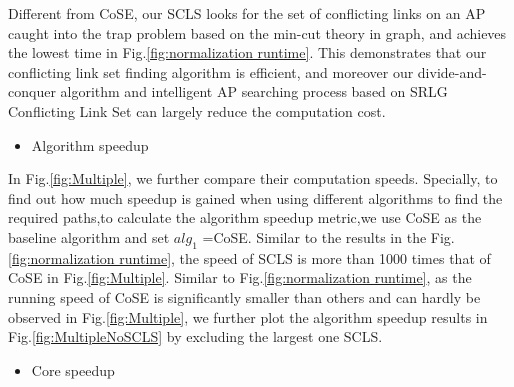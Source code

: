 Different from CoSE, our SCLS looks for the set of conflicting links on an AP caught into the trap problem based on the min-cut theory in graph, and achieves the lowest time in Fig.\ref{fig:normalization runtime}. This demonstrates that our conflicting link set finding algorithm is efficient, and moreover our divide-and-conquer algorithm and intelligent AP searching process based on SRLG Conflicting Link Set can largely reduce the computation cost.


\begin{itemize}
  \item Algorithm speedup
\end{itemize}


In Fig.\ref{fig:Multiple}, we further compare their computation speeds. Specially, to find out how much speedup is gained when using different algorithms to find the required paths,to calculate the algorithm speedup metric,we use CoSE as the baseline algorithm and set $alg_1$ =CoSE. Similar to the results in the Fig.\ref{fig:normalization runtime}, the speed of SCLS is more than 1000 times that of  CoSE in Fig.\ref{fig:Multiple}.  Similar to Fig.\ref{fig:normalization runtime}, as the running speed of CoSE is significantly smaller than others and can hardly be observed in Fig.\ref{fig:Multiple}, we further plot the algorithm speedup results in Fig.\ref{fig:MultipleNoSCLS} by excluding the largest one SCLS.

\begin{itemize}
  \item Core speedup
\end{itemize}

